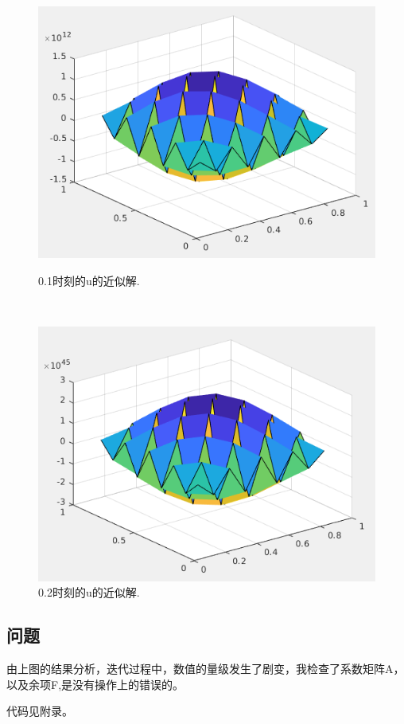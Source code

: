\documentclass[12pt,a4paper]{article}
\begin{document}
\begin{figure}[ht]
	\begin{minipage}[t]{0.4\linewidth}%
		\centering     %
		\includegraphics[width=1.2\textwidth]{./figures/time4.png}
		\caption{0.1时刻的u的近似解.}%
		\label{fig:liuchengtu1}%
	\end{minipage} 
	\hfill
	\begin{minipage}[t]{0.4\linewidth}
		\centering
		\includegraphics[width=1.2\textwidth]{./figures/time8.png}
		\caption{0.2时刻的u的近似解.}%
		\label{fig:liuchengtu2}
	\end{minipage}
\end{figure}



\subsection{问题}

由上图的结果分析，迭代过程中，数值的量级发生了剧变，我检查了系数矩阵A，以及余项F,是没有操作上的错误的。

代码见附录。
\end{document}
